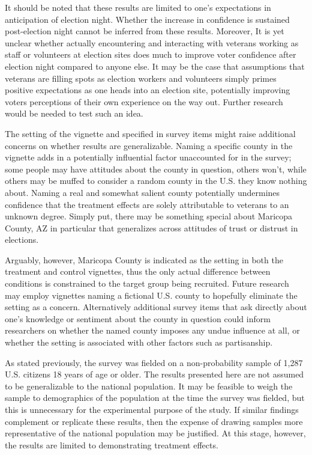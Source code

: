 \documentclass[
  12pt,
  letterpaper,
]{article}
\begin{document}
It should be noted that these results are limited to one's expectations
in anticipation of election night. Whether the increase in confidence is
sustained post-election night cannot be inferred from these results.
Moreover, It is yet unclear whether actually encountering and
interacting with veterans working as staff or volunteers at election
sites does much to improve voter confidence after election night
compared to anyone else. It may be the case that assumptions that
veterans are filling spots as election workers and volunteers simply
primes positive expectations as one heads into an election site,
potentially improving voters perceptions of their own experience on the
way out. Further research would be needed to test such an idea.

The setting of the vignette and specified in survey items might raise
additional concerns on whether results are generalizable. Naming a
specific county in the vignette adds in a potentially influential factor
unaccounted for in the survey; some people may have attitudes about the
county in question, others won't, while others may be muffed to consider
a random county in the U.S. they know nothing about. Naming a real and
somewhat salient county potentially undermines confidence that the
treatment effects are solely attributable to veterans to an unknown
degree. Simply put, there may be something special about Maricopa
County, AZ in particular that generalizes across attitudes of trust or
distrust in elections.

Arguably, however, Maricopa County is indicated as the setting in both
the treatment and control vignettes, thus the only actual difference
between conditions is constrained to the target group being recruited.
Future research may employ vignettes naming a fictional U.S. county to
hopefully eliminate the setting as a concern. Alternatively additional
survey items that ask directly about one's knowledge or sentiment about
the county in question could inform researchers on whether the named
county imposes any undue influence at all, or whether the setting is
associated with other factors such as partisanship.

As stated previously, the survey was fielded on a non-probability sample
of 1,287 U.S. citizens 18 years of age or older. The results presented
here are not assumed to be generalizable to the national population. It
may be feasible to weigh the sample to demographics of the population at
the time the survey was fielded, but this is unnecessary for the
experimental purpose of the study. If similar findings complement or
replicate these results, then the expense of drawing samples more
representative of the national population may be justified. At this
stage, however, the results are limited to demonstrating treatment
effects.
\end{document}
